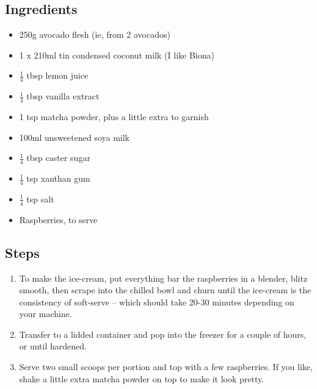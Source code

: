 \documentclass{book}
\begin{document}
\subsection*{Ingredients}
\begin{itemize}
\item 250g avocado flesh (ie, from 2 avocados)
\item 1 x 210ml tin condensed coconut milk (I like Biona)
\item $\frac{1}{4}$ tbsp lemon juice
\item $\frac{1}{4}$ tbsp vanilla extract
\item 1 tsp matcha powder, plus a little extra to garnish 
\item 100ml unsweetened soya milk
\item $\frac{1}{4}$ tbsp caster sugar
\item $\frac{1}{4}$ tsp xanthan gum
\item $\frac{1}{4}$ tsp salt
\item Raspberries, to serve
\end{itemize}

\subsection*{Steps}
\begin{enumerate}
\item To make the ice-cream, put everything bar the raspberries in a blender, blitz smooth, then scrape into the chilled bowl and churn until the ice-cream is the consistency of soft-serve – which should take 20-30 minutes depending on your machine. 
\item Transfer to a lidded container and pop into the freezer for a couple of hours, or until hardened.
\item Serve two small scoops per portion and top with a few raspberries. If you like, shake a little extra matcha powder on top to make it look pretty.
\end{enumerate}
\newpage
\end{document}
